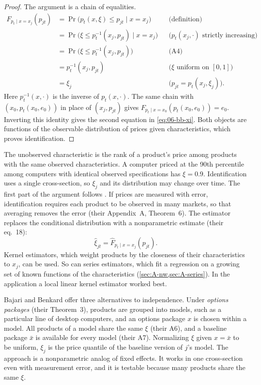\begin{proof}
The argument is a chain of equalities.
\begin{align*}
  F_{p_t \mid x = x_j}(p_{jt}) &= \Pr\bigl(p_t(x, \xi) \le p_{jt} \mid x = x_j\bigr) && \text{(definition)} \\
  &= \Pr\bigl(\xi \le p_t^{-1}(x_j, p_{jt}) \mid x = x_j\bigr) && \text{($p_t(x_j, \cdot)$ strictly increasing)} \\
  &= \Pr\bigl(\xi \le p_t^{-1}(x_j, p_{jt})\bigr) && \text{(A4)} \\
  &= p_t^{-1}(x_j, p_{jt}) && \text{($\xi$ uniform on $[0,1]$)} \\
  &= \xi_j && \text{($p_{jt} = p_t(x_j, \xi_j)$).}
\end{align*}
Here $p_t^{-1}(x, \cdot)$ is the inverse of $p_t(x, \cdot)$. The same chain with $(x_0, p_t(x_0, e_0))$ in place of $(x_j,
p_{jt})$ gives $F_{p_t \mid x = x_0}(p_t(x_0, e_0)) = e_0$. Inverting this identity gives the second equation in
\eqref{eq:06-bb-xi}. Both objects are functions of the observable distribution of prices given characteristics, which
proves identification.
\end{proof}

The unobserved characteristic is the rank of a product's price among products with the same observed characteristics. A
computer priced at the 90th percentile among computers with identical observed specifications has $\xi = 0.9$. Identification
uses a single cross-section, so $\xi_j$ and its distribution may change over time. The first part of the argument follows
\citet{Matzkin2003}. If prices are measured with error, identification requires each product to be observed in many markets,
so that averaging removes the error (their Appendix~A, Theorem~6). The estimator replaces the conditional distribution with
a nonparametric estimate (their eq.~18):
\begin{equation}\label{eq:06-bb-xihat}
  \hat\xi_{jt} = \hat F_{p_t \mid x = x_j}(p_{jt}) .
\end{equation}
Kernel estimators, which weight products by the closeness of their characteristics to $x_j$, can be used. So can
series estimators, which fit a regression on a growing set of known functions of the characteristics
(\cref{sec:A-nw,sec:A-series}). In the application a local linear kernel estimator \citep{FanGijbels1996} worked
best.

Bajari and Benkard offer three alternatives to independence. Under \emph{options packages} (their Theorem~3), products are
grouped into models, such as a particular line of desktop computers, and an options package $x$ is chosen within a model.
All products of a model share the same $\xi$ (their A6), and a baseline package $\bar x$ is available for every model (their
A7). Normalizing $\xi$ given $x = \bar x$ to be uniform, $\xi_j$ is the price quantile of the baseline version of $j$'s model.
The approach is a nonparametric analog of fixed effects. It works in one cross-section even with measurement error, and it
is testable because many products share the same $\xi$.

